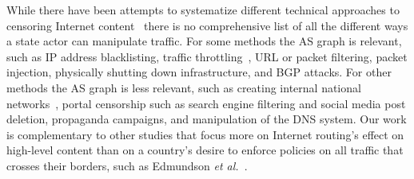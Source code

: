 While there have been attempts to systematize different technical approaches to
censoring Internet content~\cite{Tschantz2016a,Khattak2016a} there is no
comprehensive list of all the different ways a state actor can manipulate
traffic.  For some methods the AS graph is relevant, such as IP address
blacklisting, traffic throttling~\cite{DBLP:journals/corr/Anderson13}, URL or
packet filtering, packet injection, physically shutting down infrastructure, and
BGP attacks.  For other methods the AS graph is less relevant, such as creating
internal national networks~\cite{DBLP:journals/corr/abs-1209-6398}, portal
censorship such as search engine filtering and social media post deletion,
propaganda campaigns, and manipulation of the DNS system.  Our work is
complementary to other studies that focus more on Internet routing's effect on
high-level content than on a country's desire to enforce policies on all traffic
that crosses their borders, such as Edmundson \emph{et
al.}~\cite{Edmundson:2018:NHI:3209811.3211887}.


